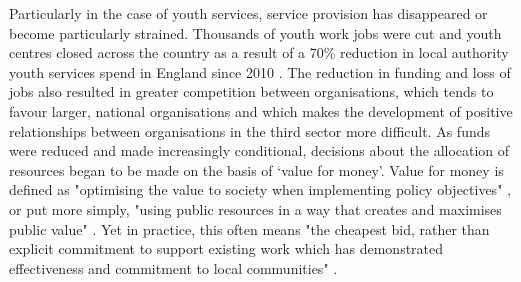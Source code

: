 Particularly in the case of youth services, service provision has disappeared or become particularly strained. Thousands of youth work jobs were cut and youth centres closed across the country as a result of a 70\% reduction in local authority youth services spend in England since 2010 \citep[p. 9]{ymca_making_2020}. The reduction in funding and loss of jobs also resulted in greater competition between organisations, which tends to favour larger, national organisations and which makes the development of positive relationships between organisations in the third sector more difficult. As funds were reduced and made increasingly conditional, decisions about the allocation of resources began to be made on the basis of `value for money'. Value for money is defined as "optimising the value to society when implementing policy objectives" \citep[p. 2]{h_m_treasury_green_2022}, or put more simply, "using public resources in a way that creates and maximises public value" \citep[p. 6]{department_for_transport_value_2015}. Yet in practice, this often means "the cheapest bid, rather than explicit commitment to support existing work which has demonstrated effectiveness and commitment to local communities" \citep[p. 732]{clayton_distancing_2016}.

